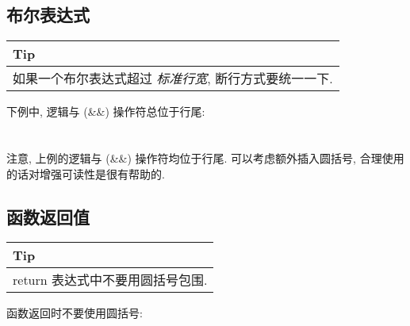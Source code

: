 \documentclass[a4paper,11pt,CJK]{article}
\begin{document}
\begin{CJK}{UTF8}{gbsn}
\subsection{布尔表达式}
\begin{table}[htbp]
\flushleft
\begin{tabular}{p{400pt}}
\toprule
\rowcolor[gray]{.8} Tip \\
\midrule
如果一个布尔表达式超过 \emph{标准行宽}, 断行方式要统一一下.\\
\bottomrule
\end{tabular}
\end{table}
下例中, 逻辑与 (\&\&) 操作符总位于行尾:\\
\\
\\
\indent 注意, 上例的逻辑与 (\&\&) 操作符均位于行尾. 可以考虑额外插入圆括号, 合理使用的话对增强可读性是很有帮助的.

\subsection{函数返回值}
\begin{table}[htbp]
\flushleft
\begin{tabular}{p{400pt}}
\toprule
\rowcolor[gray]{.8} Tip \\
\midrule
return 表达式中不要用圆括号包围.\\
\bottomrule
\end{tabular}
\end{table}
\noindent
函数返回时不要使用圆括号:\\
\\
\\
\\
\\
\\
\\

\end{CJK}
\end{document}
